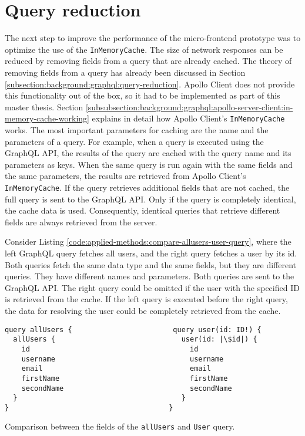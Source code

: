 \section{Query reduction}\label{section:applied-methods:query-reduction}

The next step to improve the performance of the micro-frontend prototype was to optimize the use of the \texttt{InMemoryCache}. The size of network responses can be reduced by removing fields from a query that are already cached. The theory of removing fields from a query has already been discussed in Section \ref{subsection:background:graphql:query-reduction}. Apollo Client does not provide this functionality out of the box, so it had to be implemented as part of this master thesis. Section \ref{subsubsection:background:graphql:apollo-server-client:in-memory-cache-working} explains in detail how Apollo Client's \texttt{InMemoryCache} works. The most important parameters for caching are the name and the parameters of a query. For example, when a query is executed using the GraphQL \ac{API}, the results of the query are cached with the query name and its parameters as keys. When the same query is run again with the same fields and the same parameters, the results are retrieved from Apollo Client's \texttt{InMemoryCache}. If the query retrieves additional fields that are not cached, the full query is sent to the GraphQL \ac{API}. Only if the query is completely identical, the cache data is used. Consequently, identical queries that retrieve different fields are always retrieved from the server.

\bigskip

\noindent Consider Listing \ref{code:applied-methods:compare-allusers-user-query}, where the left GraphQL query fetches all users, and the right query fetches a user by its id. Both queries fetch the same data type and the same fields, but they are different queries. They have different names and parameters. Both queries are sent to the GraphQL \ac{API}. The right query could be omitted if the user with the specified ID is retrieved from the cache. If the left query is executed before the right query, the data for resolving the user could be completely retrieved from the cache.

\ifshowListings
\begin{listing}[H]
  \begin{verbatim}
query allUsers {                        query user(id: ID!) {
  allUsers {                              user(id: |\$id|) {
    id                                      id
    username                                username
    email                                   email
    firstName                               firstName
    secondName                              secondName
  }                                       }
}                                      }
  \end{verbatim}
  \caption{Comparison between the fields of the \texttt{allUsers} and \texttt{User} query.}\label{code:applied-methods:compare-allusers-user-query}
\end{listing}
\fi

